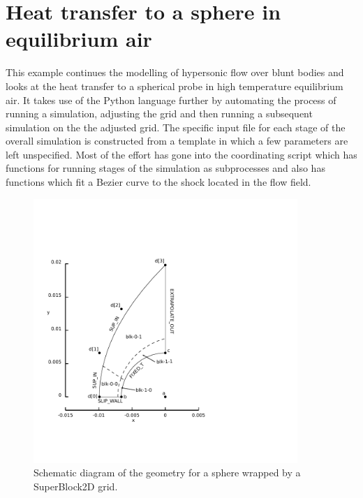 
\newpage
\section{Heat transfer to a sphere in equilibrium air}
\label{sphere-heat-transfer-sec}
%
This example continues the modelling of hypersonic flow over blunt bodies 
and looks at the heat transfer to a spherical probe \cite{rose_stark_58} in high temperature equilibrium air. 
It takes use of the Python language further by automating the process of running 
a simulation, adjusting the grid and then running a subsequent simulation on the
the adjusted grid.
The specific input file for each stage of the overall simulation is constructed from a template
in which a few parameters are left unspecified.
Most of the effort has gone into the coordinating script which has functions
for running stages of the simulation as subprocesses and also has functions
which fit a Bezier curve to the shock located in the flow field.

\begin{figure}[htbp]
\begin{center}
\includegraphics[width=10cm,viewport=23 70 296 351,clip=true]{../2D/sphere-heat-transfer/sphere0-layout.pdf}
\end{center}
\caption{Schematic diagram of the geometry for a sphere wrapped by a SuperBlock2D grid.}
\label{sphere-heat-transfer-geometry-fig}
\end{figure}

